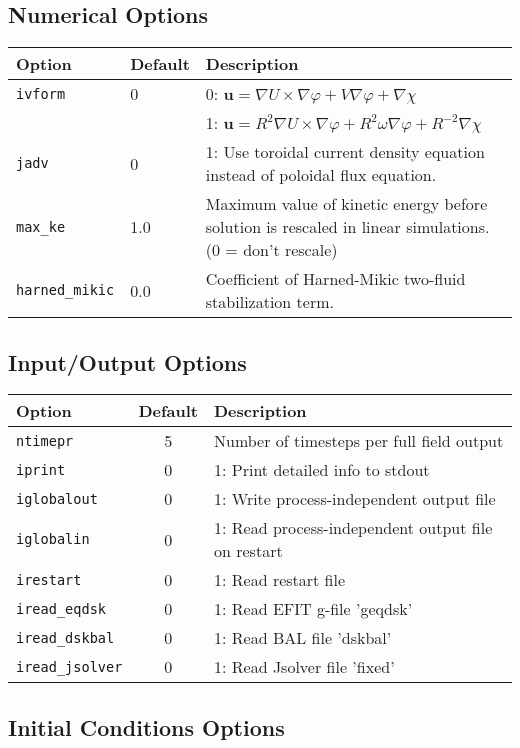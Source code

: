 \documentclass[letterpaper]{book}
\renewcommand{\vec}[1]{\ensuremath{\mathbf{#1}}}
\newcommand{\tor}{\varphi}              %
\renewcommand{\r}{R}
\renewcommand{\u}{\vec{u}}
\newcommand{\grad}[1]{\nabla #1}
\begin{document}
\subsection{Numerical Options}
\begin{tabular}{llp{3in}}
  \textbf{Option}&\textbf{Default}&\textbf{Description}\\
  \hline
  \texttt{ivform} & 0   & 0: $\u = \grad{U}\times\grad{\tor} + V
   \grad{\tor} + \grad{\chi}$\\
   & & 1: $\u = \r^2 \grad{U}\times\grad{\tor} + \r^2 \omega
   \grad{\tor} + \r^{-2} \grad{\chi}$\\
  \texttt{jadv}   & 0   & 1: Use toroidal current density equation
                          instead of poloidal flux equation.\\
  \texttt{max\_ke}& 1.0  & Maximum value of kinetic energy before solution is
                          rescaled in linear simulations. (0 = don't rescale)\\
  \texttt{harned\_mikic} & 0.0 & Coefficient of Harned-Mikic two-fluid
                          stabilization term.\\
\end{tabular}

\subsection{Input/Output Options}

\begin{tabular}{lcp{2.7in}}
  \textbf{Option}&\textbf{Default}&\textbf{Description}\\
  \hline
  \texttt{ntimepr}   & 5 & Number of timesteps per full field output\\
  \texttt{iprint}    & 0 & 1: Print detailed info to stdout\\
  \texttt{iglobalout}& 0 & 1: Write process-independent output file\\
  \texttt{iglobalin} & 0 & 1: Read process-independent output file on restart\\
  \texttt{irestart}  & 0 & 1: Read restart file\\
  \texttt{iread\_eqdsk}   & 0 & 1: Read EFIT g-file 'geqdsk'\\
  \texttt{iread\_dskbal}  & 0 & 1: Read BAL file 'dskbal'\\
  \texttt{iread\_jsolver} & 0 & 1: Read Jsolver file 'fixed'
\end{tabular}


\subsection{Initial Conditions Options}
\end{document}
